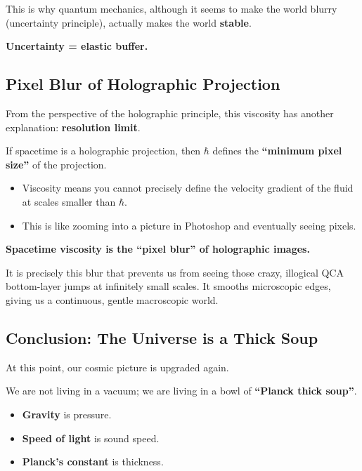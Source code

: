 This is why quantum mechanics, although it seems to make the world blurry (uncertainty principle), actually makes the world \textbf{stable}.

\textbf{Uncertainty = elastic buffer.}

\subsection{Pixel Blur of Holographic Projection}

From the perspective of the holographic principle, this viscosity has another explanation: \textbf{resolution limit}.

If spacetime is a holographic projection, then $\hbar$ defines the \textbf{``minimum pixel size''} of the projection.

\begin{itemize}
\item Viscosity means you cannot precisely define the velocity gradient of the fluid at scales smaller than $\hbar$.

\item This is like zooming into a picture in Photoshop and eventually seeing pixels.
\end{itemize}

\textbf{Spacetime viscosity is the ``pixel blur'' of holographic images.}

It is precisely this blur that prevents us from seeing those crazy, illogical QCA bottom-layer jumps at infinitely small scales. It smooths microscopic edges, giving us a continuous, gentle macroscopic world.

\subsection{Conclusion: The Universe is a Thick Soup}

At this point, our cosmic picture is upgraded again.

We are not living in a vacuum; we are living in a bowl of \textbf{``Planck thick soup''}.

\begin{itemize}
\item \textbf{Gravity} is pressure.

\item \textbf{Speed of light} is sound speed.

\item \textbf{Planck's constant} is thickness.
\end{itemize}

